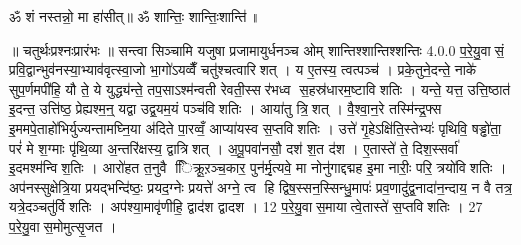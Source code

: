 ॐ शं नस्तन्नो॒ मा हा॑सीत्॥ ॐ शान्तिः॒ शान्तिः॒शान्ति॑॥



\setcounter{anuvakam}{0}
॥ चतुर्थःप्रश्नःप्रारंभः ॥ सन्त्वा सिञ्चामि यजुषा प्रजामायुर्धनञ्च ओम् शान्तिश्शान्तिश्शन्तिः
4.0.0
प॒रे॒यु॒वासं॒ प्रवि॒द्वान्भुव॑नस्या॒भ्याव॑वृत्स्वा॒जो भा॒गो॑ऽयव्वैँ चतु॑श्चत्वारिशत् । य ए॒तस्य॒ त्वत्पञ्च॑ । प्रके॒तुने॒दन्ते॒ नाके॑ सुप॒र्णमपी॑हि॒ यौ ते॒ ये युद्ध्य॑न्ते॒ तप॒साऽश्म॑न्वती रेवती॒स्सर॑भध्व स॒हस्र॑धारम॒ष्टाविशतिः । यन्ते॒ यत्त॒ उत्ति॒ष्ठात॑ इ॒दन्त॒ उत्ति॑ष्ठ॒ प्रेह्यश्म॒न्॒ यद्वा उद्व॒यम॒यं पञ्च॑विशतिः । आया॑तु त्रि॒शत् । वै॒श्वा॒न॒रे तस्मि॑न्द्र॒फ्स इ॒ममपे॒ताहो॑भिर्युज्यन्तामघ्नि॒या अ॑दिते पा॒रव्वँ॒ आप्या॑यस्व स॒प्तविशतिः । उत्ते॑ गृ॒हेऽक्षि॑ति॒स्तेभ्यः॑ पृथिवि॒ षड्ढो॑ता॒ परं॑ मे श॒ग्माः पृ॑थि॒व्या अ॒न्तरि॑क्षस्य॒ द्वात्रिशत् । अ॒पू॒पवा॑नसौ॒ दश॑ श॒त द॑श । ए॒तास्ते॑ ते॒ दिश॒स्सर्वा॑ इ॒दमश्म॑न्विश॒तिः । आरो॑हत त॒नुवै ििक्रू॒ऱञ्च॒कार॒ पुन॑र्मृ॒त्यवे॒ मा नोनु॑गाद्दद्मह इ॒मा नारीः॒ परि॒ त्रयो॑विशतिः । अप॑नस्सुक्षेत्रि॒या प्रयद्भन्दि॑ष्ठः॒ प्रयद॒ग्नेः प्रयत्ते॑ अग्ने॒ त्व हि द्विष॒स्सन॒स्सिन्धु॒मापः॑ प्रव॒णादु॑द्व॒नादा॑न॒न्दाय॒ न वै तत्र॒ यत्रे॒दञ्चतु॑र्विशतिः । अप॑श्या॒मावृ॑णीहि॒ द्वाद॑श द्वादश । 12 प॒रे॒यु॒वास॒मायात्वे॒तास्ते॑ स॒प्तविशतिः । 27 प॒रे॒यु॒वास॒मोमुत्सृ॒जत ।
\anuvakamend

